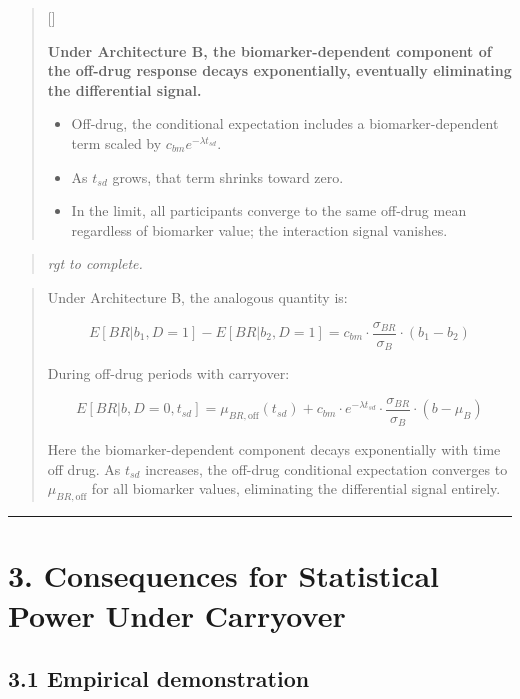 \documentclass[
  11pt,
]{article}
\newcounter{pgraph}
\newenvironment{bullets}{%
  \stepcounter{pgraph}%
  \begin{quote}\small\sffamily\color[gray]{0.30}%
  {\normalfont\scriptsize\color[gray]{0.58}[\thepgraph]\enspace}}{%
  \end{quote}}
\newenvironment{rgt}{%
  \begin{quote}\small\itshape\color[RGB]{20,60,160}}{%
  \end{quote}}
\newenvironment{orig}{%
  \begin{quote}\normalsize\color[gray]{0.55}}{%
  \end{quote}}
\begin{document}
\begin{bullets}

\textbf{Under Architecture B, the biomarker-dependent component
of the off-drug response decays exponentially, eventually
eliminating the differential signal.}

\begin{itemize}\setlength{\itemsep}{2pt}\setlength{\parskip}{0pt}
\item Off-drug, the conditional expectation includes a
  biomarker-dependent term scaled by $c_{bm} e^{-\lambda
  t_{sd}}$.
\item As $t_{sd}$ grows, that term shrinks toward zero.
\item In the limit, all participants converge to the same
  off-drug mean regardless of biomarker value; the interaction
  signal vanishes.
\end{itemize}

\end{bullets}

\begin{rgt}
rgt to complete.

\end{rgt}

\begin{orig}
Under Architecture B, the analogous quantity is:

\[E[BR | b_1, D=1] - E[BR | b_2, D=1] = c_{bm} \cdot
\frac{\sigma_{BR}}{\sigma_B} \cdot (b_1 - b_2)\]

During off-drug periods with carryover:

\[E[BR | b, D=0, t_{sd}] = \mu_{BR,\text{off}}(t_{sd}) +
c_{bm} \cdot e^{-\lambda t_{sd}} \cdot
\frac{\sigma_{BR}}{\sigma_B} \cdot (b - \mu_B)\]

Here the biomarker-dependent component decays exponentially with time
off drug. As \(t_{sd}\) increases, the off-drug conditional expectation
converges to \(\mu_{BR,\text{off}}\) for all biomarker values,
eliminating the differential signal entirely.

\end{orig}

\bigskip\noindent

\rule{\textwidth}{0.4pt}\bigskip

\section{3. Consequences for Statistical Power Under Carryover}

\subsection{3.1 Empirical demonstration}
\end{document}
